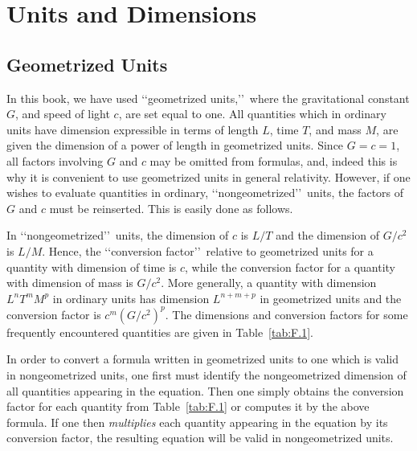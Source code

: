 
\section{Units and Dimensions}

\subsection*{Geometrized Units}

In this book, we have used \lq\lq geometrized units,\rq\rq\ where the gravitational
constant \(G\), and speed of light \(c\), are set equal to one. All quantities which
in ordinary units have dimension expressible in terms of length \(L\), time \(T\),
and mass \(M\), are given the dimension of a power of length in geometrized units.
Since \(G=c=1\), all factors involving \(G\) and \(c\) may be omitted from formulas,
and, indeed this is why it is convenient to use geometrized units in general
relativity. However, if one wishes to evaluate quantities in ordinary,
\lq\lq nongeometrized\rq\rq\ units, the factors of \(G\) and \(c\) must be reinserted.
This is easily done as follows.

In \lq\lq nongeometrized\rq\rq\ units, the dimension of \(c\) is \(L/T\) and the
dimension of \(G/c^2\) is \(L/M\). Hence, the \lq\lq conversion factor\rq\rq\
relative to geometrized units for a quantity with dimension of time is \(c\), while
the conversion factor for a quantity with dimension of mass is \(G/c^2\). More
generally, a quantity with dimension \(L^nT^mM^p\) in ordinary units has dimension
\(L^{n+m+p}\) in geometrized units and the conversion factor is \(c^m(G/c^2)^p\).
The dimensions and conversion factors for some frequently encountered quantities
are given in Table~\ref{tab:F.1}.

In order to convert a formula written in geometrized units to one which is valid in
nongeometrized units, one first must identify the nongeometrized dimension of all
quantities appearing in the equation. Then one simply obtains the conversion factor
for each quantity from Table~\ref{tab:F.1} or computes it by the above formula. If
one then \emph{multiplies} each quantity appearing in the equation by its conversion
factor, the resulting equation will be valid in nongeometrized units.

